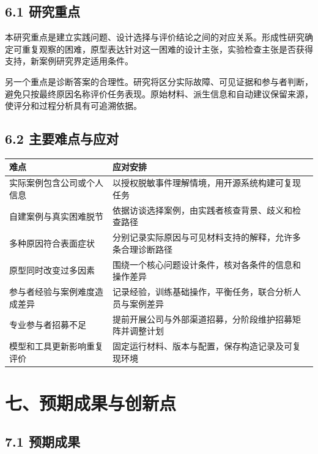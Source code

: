 \subsection{6.1 研究重点}

本研究重点是建立实践问题、设计选择与评价结论之间的对应关系。形成性研究确定可重复观察的困难，原型表达针对这一困难的设计主张，实验检查主张是否获得支持，新案例研究界定适用条件。

另一个重点是诊断答案的合理性。研究将区分实际故障、可见证据和参与者判断，避免只按最终原因名称评价任务表现。原始材料、派生信息和自动建议保留来源，使评分和过程分析具有可追溯依据。

\subsection{6.2 主要难点与应对}

\begin{table}[H]
  \centering
  \small
  \begin{tabularx}{\textwidth}{Y Y}
    \toprule
    难点 & 应对安排 \\
    \midrule
    实际案例包含公司或个人信息 & 以授权脱敏事件理解情境，用开源系统构建可复现任务 \\
    自建案例与真实困难脱节 & 依据访谈选择案例，由实践者核查背景、歧义和检查路径 \\
    多种原因符合表面症状 & 分别记录实际原因与可见材料支持的解释，允许多条合理诊断路径 \\
    原型同时改变过多因素 & 围绕一个核心问题设计条件，核对各条件的信息和操作差异 \\
    参与者经验与案例难度造成差异 & 记录经验，训练基础操作，平衡任务，联合分析人员与案例差异 \\
    专业参与者招募不足 & 提前开展公司与外部渠道招募，分阶段维护招募矩阵并调整计划 \\
    模型和工具更新影响重复评价 & 固定运行材料、版本与配置，保存构造记录及可复现环境 \\
    \bottomrule
  \end{tabularx}
\end{table}

\section{七、预期成果与创新点}

\subsection{7.1 预期成果}

